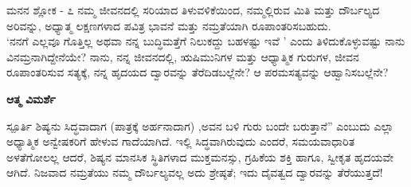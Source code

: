 \begin{mananam}{\mananamfont ಮನನ ಶ್ಲೋಕ - ೭}
\footnotesize \mananamtext ನಮ್ಮ ಜೀವನದಲ್ಲಿ ಸರಿಯಾದ ತಿಳುವಳಿಕೆಯಿಂದ, ನಮ್ಮಲ್ಲಿರುವ ಮಿತಿ ಮತ್ತು  ದೌರ್ಬಲ್ಯದ  ಅರಿವನ್ನು, ಅಧ್ಯಾತ್ಮ ಲಕ್ಷಣಗಳಾದ ಪವಿತ್ರ ಭಾವನೆ ಮತ್ತು ನಮ್ರತೆಯಾಗಿ ರೂಪಾಂತರಿಸಬಹುದು. \\
‘ನನಗೆ ಎಲ್ಲವೂ ಗೊತ್ತಿಲ್ಲ ಅಥವಾ ನನ್ನ ಬುದ್ಧಿಮತ್ತೆಗೆ ನಿಲುಕದ್ದು ಬಹಳಷ್ಟು ಇವೆ ’ ಎಂದು ತಿಳಿದುಕೊಳ್ಳುವಷ್ಟು ನಾನು ವಿನಮ್ರನಾಗಿದ್ದೇನೆಯೇ? ನಾನು, ನನ್ನ ಜೀವನದಲ್ಲಿ, ಋಷಿಮುನಿಗಳ ಮತ್ತು ಆಧ್ಯಾತ್ಮಿಕ ಗುರುಗಳ, ಜೀವನ  ರೂಪಾಂತರಿಸುವ ಸತ್ಯಕ್ಕೆ, ನನ್ನ ಹೃದಯದ ದ್ವಾರವನ್ನು ತೆರೆದಿಡಬಲ್ಲೆನೇ? ಆ ಪರಮಸತ್ಯವನ್ನು ಆಹ್ವಾನಿಸಬಲ್ಲೆನೇ?
\end{mananam}
\WritingHand\enspace\textbf{ಆತ್ಮ ವಿಮರ್ಶೆ}
\begin{inspiration}{\mananamfont ಸ್ಪೂರ್ತಿ}
\footnotesize \mananamtext ಶಿಷ್ಯನು ಸಿದ್ಧವಾದಾಗ (ಪಾತ್ರಕ್ಕೆ ಅರ್ಹನಾದಾಗ) ,ಅವನ ಬಳಿ ಗುರು ಬಂದೇ ಬರುತ್ತಾನೆ” ಎಂಬುದು ಎಲ್ಲಾ ಅಧ್ಯಾತ್ಮಿಕ ಅನ್ವೇಷಕರಿಗೆ ಹೇಳುವ ಗಾದೆಯಾಗಿದೆ. ಇಲ್ಲಿ ಸಿದ್ಧವಾಗಿರುವುದು ಎಂದರೆ, ಸಮಯವಾಧಾರಿತ ಅಳತೆಗೋಲಲ್ಲ ಆದರೆ, ಶಿಷ್ಯನ ಮಾನಸಿಕ ಸ್ಥಿತಿಗಳಾದ ಮುಕ್ತಮನಸ್ಸು, ಗ್ರಹಿಕೆಯ ಶಕ್ತಿ ಹಾಗೂ, ಸ್ವೀಕೃತ ಹೃದಯವೇ ಆಗಿದೆ. ನಿಜವಾದ ನಮ್ರತೆಯು ನಮ್ಮ ದೌರ್ಬಲ್ಯವಲ್ಲ ಅದು ಶ್ರೇಷ್ಠತೆ; ಇದು ದೈವತ್ವದ ದ್ವಾರವನ್ನು ತೆರೆಯುತ್ತದೆ!
\end{inspiration}
\newpage

